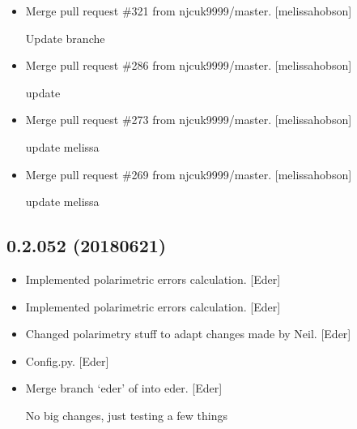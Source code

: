 \documentclass[a4paper,10pt,english]{report}
\begin{document}
\begin{itemize}
\item {} 
Merge pull request \#321 from njcuk9999/master. {[}melissa\sphinxhyphen{}hobson{]}

Update branche

\item {} 
Merge pull request \#286 from njcuk9999/master. {[}melissa\sphinxhyphen{}hobson{]}

update

\item {} 
Merge pull request \#273 from njcuk9999/master. {[}melissa\sphinxhyphen{}hobson{]}

update melissa

\item {} 
Merge pull request \#269 from njcuk9999/master. {[}melissa\sphinxhyphen{}hobson{]}

update melissa

\end{itemize}


\subsection{0.2.052 (2018\sphinxhyphen{}06\sphinxhyphen{}21)}
\label{\detokenize{misc/changelog:id432}}\begin{itemize}
\item {} 
Implemented polarimetric errors calculation. {[}Eder{]}

\item {} 
Implemented polarimetric errors calculation. {[}Eder{]}

\item {} 
Changed polarimetry stuff to adapt changes made by Neil. {[}Eder{]}

\item {} 
Config.py. {[}Eder{]}

\item {} 
Merge branch ‘eder’ of  into
eder. {[}Eder{]}

No big changes, just testing a few things

\end{itemize}
\end{document}
